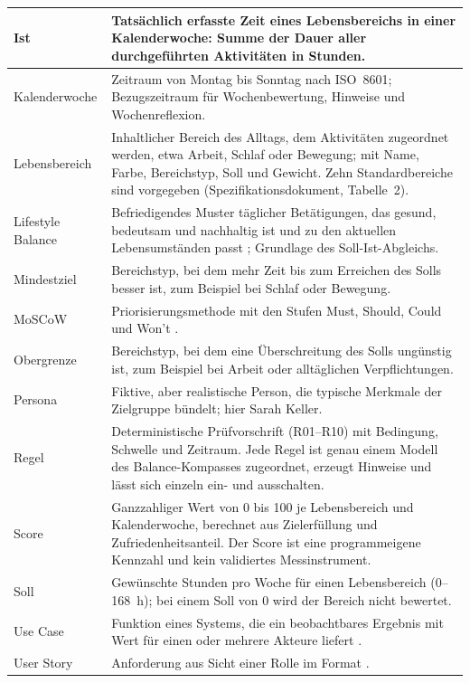\begin{longtable}{@{}L{3.4cm}L{11.8cm}@{}}
  \midrule
  Ist & Tatsächlich erfasste Zeit eines Lebensbereichs in einer Kalenderwoche: Summe der Dauer aller durchgeführten Aktivitäten in Stunden. \\
  \midrule
  Kalenderwoche & Zeitraum von Montag bis Sonntag nach ISO~8601; Bezugszeitraum für Wochenbewertung, Hinweise und Wochenreflexion. \\
  \midrule
  Lebensbereich & Inhaltlicher Bereich des Alltags, dem Aktivitäten zugeordnet werden, etwa Arbeit, Schlaf oder Bewegung; mit Name, Farbe, Bereichstyp, Soll und Gewicht. Zehn Standardbereiche sind vorgegeben (Spezifikationsdokument, Tabelle~2). \\
  \midrule
  Lifestyle Balance & Befriedigendes Muster täglicher Betätigungen, das gesund, bedeutsam und nachhaltig ist und zu den aktuellen Lebensumständen passt \parencite[S.~11]{matuska2008}; Grundlage des Soll-Ist-Abgleichs. \\
  \midrule
  Mindestziel & Bereichstyp, bei dem mehr Zeit bis zum Erreichen des Solls besser ist, zum Beispiel bei Schlaf oder Bewegung. \\
  \midrule
  MoSCoW & Priorisierungsmethode mit den Stufen Must, Should, Could und Won't \parencite[Kap.~10]{dsdm2014}. \\
  \midrule
  Obergrenze & Bereichstyp, bei dem eine Überschreitung des Solls ungünstig ist, zum Beispiel bei Arbeit oder alltäglichen Verpflichtungen. \\
  \midrule
  Persona & Fiktive, aber realistische Person, die typische Merkmale der Zielgruppe bündelt; hier Sarah Keller. \\
  \midrule
  Regel & Deterministische Prüfvorschrift (R01--R10) mit Bedingung, Schwelle und Zeitraum. Jede Regel ist genau einem Modell des Balance-Kompasses zugeordnet, erzeugt Hinweise und lässt sich einzeln ein- und ausschalten. \\
  \midrule
  Score & Ganzzahliger Wert von 0 bis 100 je Lebensbereich und Kalenderwoche, berechnet aus Zielerfüllung und Zufriedenheitsanteil. Der Score ist eine programmeigene Kennzahl und kein validiertes Messinstrument. \\
  \midrule
  Soll & Gewünschte Stunden pro Woche für einen Lebensbereich (0--168~h); bei einem Soll von 0 wird der Bereich nicht bewertet. \\
  \midrule
  Use Case & Funktion eines Systems, die ein beobachtbares Ergebnis mit Wert für einen oder mehrere Akteure liefert \parencite[S.~639]{omg2017uml}. \\
  \midrule
  User Story & Anforderung aus Sicht einer Rolle im Format  \parencite[S.~1-12]{swebok2026}. \\

\end{longtable}

